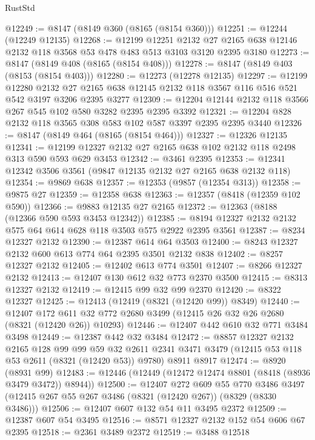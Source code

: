 \begin{lexlean}{RustStd}
\begin{coremodule}
@12249 := @8147 (@8149 @360 (@8165 (@8154 @360)))
@12251 := @12244 (@12249 @12135)
@12268 := @12199
    @12251
    @2132
    @27
    @2165
    @638
    @12146
    @2132
    @118
    @3568
    @53
    @478
    @483
    @513
    @3103
    @3120
    @2395
    @3180
@12273 := @8147 (@8149 @408 (@8165 (@8154 @408)))
@12278 := @8147 (@8149 @403 (@8153 (@8154 @403)))
@12280 := @12273 (@12278 @12135)
@12297 := @12199
    @12280
    @2132
    @27
    @2165
    @638
    @12145
    @2132
    @118
    @3567
    @116
    @516
    @521
    @542
    @3197
    @3206
    @2395
    @3277
@12309 := @12204 @12144 @2132 @118 @3566 @267 @545 @102 @580 @3282 @2395 @2395 @3392
@12321 := @12204 @828 @2132 @118 @3565 @308 @583 @102 @587 @3397 @2395 @2395 @3440
@12326 := @8147 (@8149 @464 (@8165 (@8154 @464)))
@12327 := @12326 @12135
@12341 := @12199 @12327 @2132 @27 @2165 @638 @102 @2132 @118 @2498 @313 @590 @593 @629 @3453
@12342 := @3461 @2395
@12353 := @12341 @12342 @3506 @3561 (@9847 @12135 @2132 @27 @2165 @638 @2132 @118)
@12354 := @9869 @638
@12357 := @12353 (@9857 (@12354 @313))
@12358 := @9875 @27
@12359 := @12358 @638
@12363 := @12357 (@8418 (@12359 @102 @590))
@12366 := @9883 @12135 @27 @2165
@12372 := @12363 (@8188 (@12366 @590 @593 @3453 @12342))
@12385 := @8194 @12327 @2132 @2132 @575 @64 @614 @628 @118 @3503 @575 @2922 @2395 @3561
@12387 := @8234 @12327 @2132
@12390 := @12387 @614 @64 @3503
@12400 := @8243 @12327 @2132 @600 @613 @774 @64 @2395 @3501 @2132 @838
@12402 := @8257 @12327 @2132
@12405 := @12402 @613 @774 @3501
@12407 := @8266 @12327 @2132
@12413 := @12407 @130 @612 @32 @773 @2370 @3500
@12415 := @8313 @12327 @2132
@12419 := @12415 @99 @32 @99 @2370
@12420 := @8322 @12327
@12425 := @12413 (@12419 (@8321 (@12420 @99)) @8349)
@12440 := @12407
    @172
    @611
    @32
    @772
    @2680
    @3499
    (@12415 @26 @32 @26 @2680 (@8321 (@12420 @26)) @10293)
@12446 := @12407 @442 @610 @32 @771 @3484 @3498
@12449 := @12387 @442 @32 @3484
@12472 := @8857
    @12327
    @2132
    @2165
    @128
    @99
    @99
    @59
    @32
    @2611
    @2341
    @3471
    @3479
    (@12415 @53 @118 @53 @2611 (@8321 (@12420 @53)) @9780)
    @8911
    @8917
@12474 := @8920 (@8931 @99)
@12483 := @12446 (@12449 (@12472 @12474 @8801 (@8418 (@8936 @3479 @3472)) @8944))
@12500 := @12407
    @272
    @609
    @55
    @770
    @3486
    @3497
    (@12415 @267 @55 @267 @3486 (@8321 (@12420 @267)) (@8329 (@8330 @3486)))
@12506 := @12407 @607 @132 @54 @11 @3495 @2372
@12509 := @12387 @607 @54 @3495
@12516 := @8571 @12327 @2132 @152 @54 @606 @67 @2395
@12518 := @2361 @3489 @2372
@12519 := @3488 @12518

\end{coremodule}
\end{lexlean}
